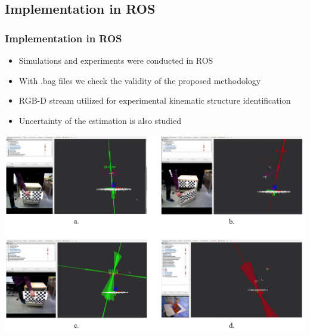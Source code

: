 \documentclass{beamer}
\begin{document}
\subsection{Implementation in ROS}
\begin{frame}
\frametitle{Implementation in ROS}
\begin{itemize}
\item Simulations and experiments were conducted in ROS
\item With .bag files we check the validity of the proposed methodology 
\item RGB-D stream utilized for experimental kinematic structure identification
\item Uncertainty of the estimation is also studied
\end{itemize}
\includegraphics[scale=0.23]{cover.png}
	\centering

\end{frame}
\end{document}
